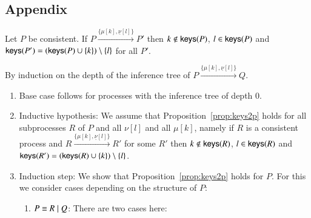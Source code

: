 \begin{subappendices}
\section*{Appendix}


\setcounter{proposition}{3}
\setcounter{thm}{0}

\begin{proposition}\label{prop:keys2p}
Let $P$ be consistent. If $P \xrightarrow{\{\mu[k], \underline{\nu}[l]\}} P'$ then $k \notin \mathsf{keys}(P)$, $l \in \mathsf{keys}(P)$  
	and $\mathsf{keys}(P')=(\mathsf{keys}(P) \cup \{k\})\setminus\{l\}$ for all $P'$.\\
\end{proposition}

\begin{pf}By induction on the depth of the inference tree of $P \xrightarrow{\{\mu[k], \underline{\nu}[l]\}} Q$.
\begin{enumerate}
\item Base case follows for processes with the inference tree of depth 0.
\item Inductive hypothesis: We assume that Proposition~\ref{prop:keys2p} holds for all subprocesses $R$ of $P$ and all $\nu[l]$ and all $\mu[k]$, namely if $R$ is a consistent process and $R \xrightarrow{\{\mu[k], \underline{\nu}[l]\}} R'$ for some $R'$ then $k \notin \mathsf{keys}(R)$, $l \in \mathsf{keys}(R)$ and $\mathsf{keys}(R')=(\mathsf{keys}(R) \cup \{k\})\setminus\{l\}$.
\item Induction step: We show that Proposition~\ref{prop:keys2p} holds for $P$. For this we consider cases depending on the structure of $P$:
\begin{enumerate}
\item $P \equiv R \; \vert \; Q$: There are two cases here:
\begin{enumerate}


\end{enumerate}
\end{enumerate}
\end{enumerate}
\end{pf}
\end{subappendices}
